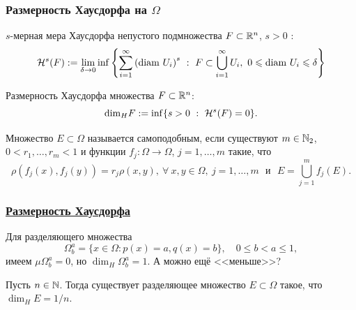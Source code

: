 \begin{frame}\frametitle{Размерность Хаусдорфа на $\Omega$}


	$s$-мерная мера Хаусдорфа непустого подмножества $F\subset \mathbb{R}^n$, $s > 0$ :
	$$\mathcal H^s(F) := \lim_{\delta\to0} \inf \left\{\sum_{i=1}^\infty \left({\rm diam} \ U_i \right)^s \ : \ F\subset \bigcup_{i=1}^\infty  U_i, \  0\leqslant {\rm diam} \ U_i \leqslant \delta \right\}$$

	\vfill

	Размерность Хаусдорфа множества  $F\subset \mathbb{R}^n$:
	$${\rm dim}_H F := \inf\{ s > 0 \ : \ \mathcal H^s(F)=0\}.$$

	\vfill

	\begin{ddefinition}
		Множество $E\subset\Omega$ называется самоподобным, если существуют $m\in\mathbb{N}_2$,
		$0< r_1, \dots, r_m<1$ и функции $f_j : \Omega \to \Omega$, $j=1,\dots, m$ такие, что
		$$
			\rho(f_j(x), f_j(y)) = r_j \rho(x,y), \ \forall \ x,y \in \Omega, \ j=1,\dots, m
			\mbox{~~и~~} E=\bigcup_{j=1}^m f_j(E).
		$$

	\end{ddefinition}
\end{frame}







\begin{frame}\frametitle{\underline{Размерность Хаусдорфа}}

	Для разделяющего множества
	\begin{equation}
		\Omega^a_b = \{x\in\Omega : p(x) = a, q(x) = b\}
		,
		\quad 0 \leq b < a \leq 1
		,
	\end{equation}
	имеем $\mu\Omega^a_b = 0$, но  $\dim_H \Omega^a_b = 1$. А можно ещё <<меньше>>?

	\vfill


	\begin{ttheorem}
		Пусть $n\in\mathbb{N}$.
		Тогда существует разделяющее множество $E\subset\Omega$ такое,
		что $\dim_H E = 1/n$.
	\end{ttheorem}
\end{frame}
